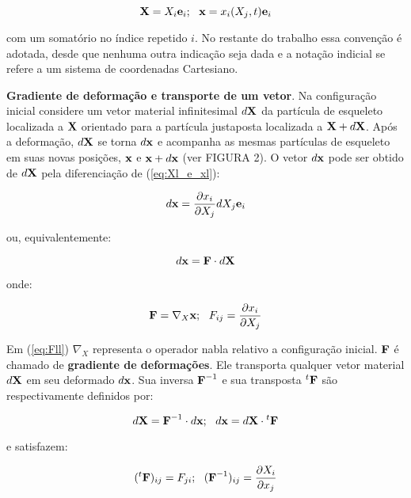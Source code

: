 \documentclass[
	11pt, %
	fleqn, %
	a4paper, %
]{LegrandOrangeBook}
\begin{document}
\begin{equation}
		\label{eq:Xl_e_xl}	
		\textbf{X} = X_i \textbf{e}_i; ~~ \textbf{x} = x_i(X_j,t)\textbf{e}_i
\end{equation}

com um somatório no índice repetido $i$. No restante do trabalho essa convenção é adotada, desde que nenhuma outra indicação seja dada e a notação indicial se refere a um sistema de coordenadas Cartesiano.

\textbf{Gradiente de deformação e transporte de um vetor}. Na configuração inicial considere um vetor material infinitesimal $d\textbf{X}$ da partícula de esqueleto localizada a $\textbf{X}$ orientado para a partícula justaposta localizada a $\textbf{X}+d\textbf{X}$. Após a deformação, $d\textbf{X}$ se torna $d\textbf{x}$ e acompanha as mesmas partículas de esqueleto em suas novas posições, $\textbf{x}$ e $\textbf{x}+d\textbf{x}$ (ver FIGURA 2). O vetor $d\textbf{x}$ pode ser obtido de $d\textbf{X}$ pela diferenciação de (\ref{eq:Xl_e_xl}):

\begin{equation}
	\label{eq:dx_indicial}	
	d\textbf{x} = \dfrac{\partial x_i}{\partial X_j}dX_j\textbf{e}_i
\end{equation}

ou, equivalentemente:

\begin{equation}
	\label{eq:dx}	
	d\textbf{x} = \textbf{F} \cdot d\textbf{X}
\end{equation}

onde:

\begin{equation}
	\label{eq:Fll}	
	\textbf{F} = \nabla_X \textbf{x} ; ~~ F_{ij} = \dfrac{\partial x_i}{\partial X_j}
\end{equation}

Em (\ref{eq:Fll}) $\nabla_X$ representa o operador nabla relativo a configuração inicial. $\textbf{F}$ é chamado de \textbf{gradiente de deformações}. Ele transporta qualquer vetor material $d\textbf{X}$ em seu deformado $d\textbf{x}$. Sua inversa $\textbf{F}^{-1}$ e sua transposta ${}^t \textbf{F}$ são respectivamente definidos por:

\begin{equation}
	\label{eq:inversaFll_e_transpostaFll}	
	d\textbf{X} = \textbf{F}^{-1} \cdot d\textbf{x}; ~~ d\textbf{x} = d\textbf{X} \cdot {}^t\textbf{F}
\end{equation}

e satisfazem:

\begin{equation}
	\label{eq:inversaFll_e_transpostaFll2}	
	({}^t\textbf{F})_{ij} = F_{ji}; ~~(\textbf{F}^{-1})_{ij} = \dfrac{\partial X_i}{\partial x_j}
\end{equation}
\end{document}

